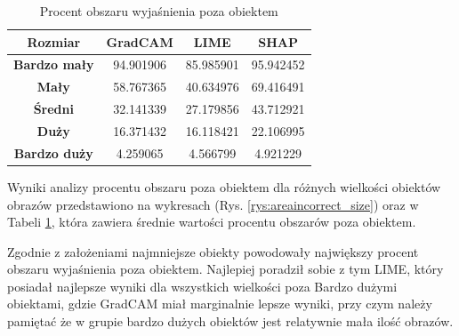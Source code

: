 \begin{table}[h]
	\centering
	\begin{tabular}{|c|c|c|c|}
		\hline
		\textbf{Rozmiar}     & \textbf{GradCAM} & \textbf{LIME} & \textbf{SHAP} \\
		\hline
		\textbf{Bardzo mały} & 94.901906        & 85.985901     & 95.942452     \\
		\hline
		\textbf{Mały}        & 58.767365        & 40.634976     & 69.416491     \\
		\hline
		\textbf{Średni}      & 32.141339        & 27.179856     & 43.712921     \\
		\hline
		\textbf{Duży}        & 16.371432        & 16.118421     & 22.106995     \\
		\hline
		\textbf{Bardzo duży} & 4.259065         & 4.566799      & 4.921229      \\
		\hline
	\end{tabular}
	\caption{Procent obszaru wyjaśnienia poza obiektem}
	\label{tab:size_area}
\end{table}

Wyniki analizy procentu obszaru poza obiektem dla różnych wielkości obiektów obrazów przedstawiono na wykresach (Rys. \ref{rys:areaincorrect_size}) oraz w Tabeli \ref{tab:size_area}, która zawiera średnie wartości procentu obszarów poza obiektem.

Zgodnie z założeniami najmniejsze obiekty powodowały największy procent obszaru wyjaśnienia poza obiektem.
Najlepiej poradził sobie z tym LIME, który posiadał najlepsze wyniki dla wszystkich wielkości poza Bardzo dużymi obiektami, gdzie GradCAM miał marginalnie lepsze wyniki, przy czym należy pamiętać że w grupie bardzo dużych obiektów jest relatywnie mała ilość obrazów.

\vspace{1cm}

